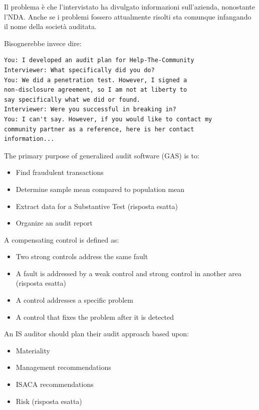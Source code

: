 Il problema è che l'intervistato ha divulgato informazioni sull'azienda, nonostante l'NDA. Anche se i problemi fossero attualmente risolti sta comunque infangando il nome della società auditata.


Bisognerebbe invece dire:
\begin{verbatim}
You: I developed an audit plan for Help-The-Community
Interviewer: What specifically did you do?
You: We did a penetration test. However, I signed a
non-disclosure agreement, so I am not at liberty to
say specifically what we did or found.
Interviewer: Were you successful in breaking in?
You: I can't say. However, if you would like to contact my
community partner as a reference, here is her contact
information...
\end{verbatim}




The primary purpose of generalized audit software (GAS) is to:
\begin{itemize}
\item Find fraudulent transactions
\item Determine sample mean compared to population mean
\item Extract data for a Substantive Test (risposta esatta)
\item Organize an audit report
\end{itemize}



A compensating control is defined as:
\begin{itemize}
\item Two strong controls address the same fault
\item A fault is addressed by a weak control and strong control in another area (risposta esatta)
\item A control addresses a specific problem
\item A control that fixes the problem after it is detected
\end{itemize}



An IS auditor should plan their audit approach based upon:

\begin{itemize}
\item Materiality
\item Management recommendations
\item ISACA recommendations
\item Risk (risposta esatta)
\end{itemize}

